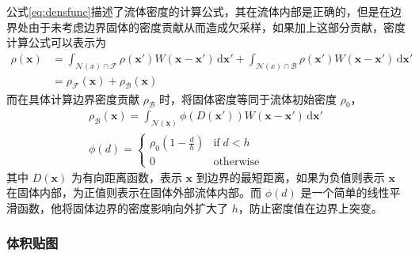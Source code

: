     公式\ref{eq:densfunc}描述了流体密度的计算公式，其在流体内部是正确的，但是在边界处由于未考虑边界固体的密度贡献从而造成欠采样，如果加上这部分贡献，密度计算公式可以表示为
    \begin{equation}\label{eq:densfuncb}
    	\begin{aligned}
    	\rho(\mathbf x) &=
    	\int_{\mathcal N (x) \cap \mathcal F} \rho(\mathbf x') W(\mathbf{x} - \mathbf{x}')\, \mathrm d \mathbf x'
    	+
    	\int_{\mathcal N (x) \cap \mathcal B} \rho(\mathbf x') W(\mathbf{x} - \mathbf{x}')\, \mathrm d \mathbf x'
    	\\
    	&= \rho_{\mathcal F}(\mathbf x) + \rho_{\mathcal B}(\mathbf x)
    	\end{aligned}
    \end{equation}
    而在具体计算边界密度贡献 $\rho_{\mathcal B}$ 时，将固体密度等同于流体初始密度 $\rho_0$，
    \begin{equation}
    	\begin{gathered}
    	\rho_{\mathcal B}(\mathbf x) =
    	\int_{\mathcal N(\mathbf x)} \phi (D(\mathbf x')) W(\mathbf{x} - \mathbf{x}') \, \mathrm d \mathbf x'
    	\\
    	\phi(d) = 
    	\left\{
    	\begin{array}{ll}
    	\rho_0 (1 - \frac {d}{h}) & \mathrm{if} \; d < h \\
    	0 & \mathrm{otherwise}
    	\end{array}
    	\right.
    	\end{gathered}
    \end{equation}
    其中 $D(\mathbf x)$ 为有向距离函数，表示 $\mathbf x$ 到边界的最短距离，如果为负值则表示 $\mathbf x$ 在固体内部，为正值则表示在固体外部流体内部。而 $\phi(d)$ 是一个简单的线性平滑函数，他将固体边界的密度影响向外扩大了 $h$，防止密度值在边界上突变。

\subsubsection{体积贴图}

